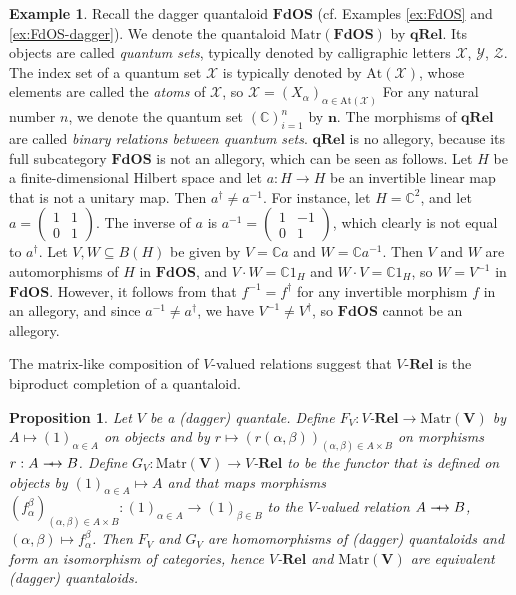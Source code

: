\documentclass[12pt]{tac}
\newtheorem{proposition}[theorem]{Proposition}
\theoremstyle{definition}
\newtheorem{example}[theorem]{Example}
\theoremstyle{remark}
\newcommand{\X}{\mathcal X}
\newcommand{\Y}{\mathcal Y}
\newcommand{\Z}{\mathcal Z}
\newcommand{\CC}{\mathbb C}
\newcommand{\<}{\langle}
\renewcommand{\>}{\rangle}
\renewcommand{\:}{\colon}
\newcommand{\At}{\mathrm{At}}
\newcommand{\qRel}{\mathbf{qRel}}
\def\sto{\relbar\joinrel\mapstochar\joinrel\rightarrow}
\begin{document}
\begin{example}\label{ex:qRel}
Recall the dagger quantaloid $\mathbf{FdOS}$ (cf. Examples \ref{ex:FdOS} and \ref{ex:FdOS-dagger}). We denote the quantaloid $\mathrm{Matr}(\mathbf{FdOS})$ by $\mathbf{qRel}$. Its objects are called \emph{quantum sets}, typically denoted by calligraphic letters $\X$, $\Y$, $\Z$. The index set of a quantum set $\X$ is typically denoted by $\At(\X)$, whose elements are called the \emph{atoms} of $\X$, so $\X=(X_\alpha)_{\alpha\in\At(\X)}$ For any natural number $n$, we denote the quantum set $(\CC)_{i=1}^n$ by $\mathbf n$. The morphisms of $\qRel$ are called \emph{binary relations between quantum sets}. $\mathbf{qRel}$ is no allegory, because its full subcategory $\mathbf{FdOS}$ is not an allegory, which can be seen as follows. Let $H$ be a finite-dimensional Hilbert space and let $a:H\to H$ be an invertible linear map that is not a unitary map. Then $a^\dag\neq a^{-1}$. For instance, let $H=\mathbb C^2$, and let $a=\begin{pmatrix}
    1 & 1\\
    0 & 1
\end{pmatrix}$. The inverse of $a$ is $a^{-1}=\begin{pmatrix}
    1 & -1\\
    0 & 1
\end{pmatrix}$, which clearly is not equal to $a^\dag$.  Let $V,W\subseteq B(H)$ be given by $V=\CC a$ and $W=\CC a^{-1}$. Then $V$ and $W$ are automorphisms of $H$ in $\mathbf{FdOS}$, and $V\cdot W=\CC 1_H$ and $W\cdot V=\CC 1_H$, so $W=V^{-1}$ in $\mathbf{FdOS}$. However, it follows from  \cite[Lemma A.3.2.3]{johnstone:elephant1} that  $f^{-1}=f^\dag$ for any invertible morphism $f$ in an allegory, and since $a^{-1}\neq a^\dag$, we have $V^{-1}\neq V^\dag$, so $\mathbf{FdOS}$ cannot be an allegory.
\end{example}


The matrix-like composition of $V$-valued relations suggest that $V$-$\mathbf{Rel}$ is the biproduct completion of a quantaloid. 

\begin{proposition}\label{prop:VRelisMatrV}
    Let $V$ be a (dagger) quantale. Define $F_V:V$-$\mathbf{Rel}\to\mathrm{Matr}(\mathbf V)$ by $A\mapsto (1)_{\alpha\in A}$ on objects and by $r\mapsto (r(\alpha,\beta))_{(\alpha,\beta)\in A\times B}$ on morphisms $r:A\sto B$. Define $G_V:\mathrm{Matr}(\mathbf V)\to V$-$\mathbf{Rel}$ to be the functor that is defined on objects by $(1)_{\alpha\in A}\mapsto A$ and that maps  morphisms $(f_\alpha^\beta)_{(\alpha,\beta)\in A\times B}:(1)_{\alpha\in A}\to(1)_{\beta\in B}$ to the $V$-valued relation $A\sto B$, $(\alpha,\beta)\mapsto f_\alpha^\beta$. Then $F_V$ and $G_V$ are homomorphisms of (dagger) quantaloids and form an isomorphism of categories, hence $V$-$\mathbf{Rel}$ and $\mathrm{Matr}(\mathbf V)$ are equivalent (dagger) quantaloids.
\end{proposition}
\end{document}
